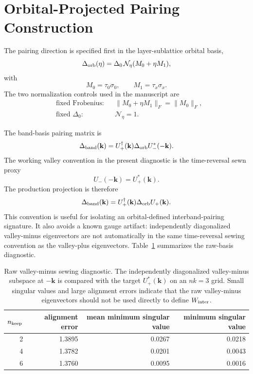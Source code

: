 \documentclass[aps,prb,preprint,superscriptaddress,floatfix,nofootinbib]{revtex4-2}
\begin{document}
\section{Orbital-Projected Pairing Construction}

The pairing direction is specified first in the layer-sublattice orbital basis,
\begin{equation}
  \Delta_{\rm orb}(\eta)
  =
  \Delta_0\,\mathcal{N}_{\eta}(M_0+\eta M_1),
\end{equation}
with
\begin{equation}
  M_0=\tau_0\sigma_0,\qquad
  M_1=\tau_x\sigma_x.
\end{equation}
The two normalization controls used in the manuscript are
\begin{align}
  &\text{fixed Frobenius:}
  &&\|M_0+\eta M_1\|_F=\|M_0\|_F,\\
  &\text{fixed }\Delta_0:
  &&\mathcal{N}_{\eta}=1.
\end{align}

The band-basis pairing matrix is
\begin{equation}
  \Delta_{\rm band}(\mathbf{k})
  =
  U_+^\dagger(\mathbf{k})\Delta_{\rm orb}U_-^*(-\mathbf{k}).
\end{equation}
The working valley convention in the present diagnostic is the time-reversal
sewn proxy
\begin{equation}
  U_{-}(-\mathbf{k}) = U_{+}^*(\mathbf{k}).
\end{equation}
The production projection is therefore
\begin{equation}
  \Delta_{\rm band}(\mathbf{k})
  =
  U_+^\dagger(\mathbf{k})\Delta_{\rm orb}U_+(\mathbf{k}).
\end{equation}
This convention is useful for isolating an orbital-defined interband-pairing
signature.  It also avoids a known gauge artifact: independently diagonalized
valley-minus eigenvectors are not automatically in the same time-reversal
sewing convention as the valley-plus eigenvectors.  Table~\ref{tab:sm_valley_sewing}
summarizes the raw-basis diagnostic.

\begin{table}[t]
\caption{Raw valley-minus sewing diagnostic.  The independently diagonalized
valley-minus subspace at $-\mathbf{k}$ is compared with the target
$U_+^*(\mathbf{k})$ on an $nk=3$ grid.  Small singular values and large
alignment errors indicate that the raw valley-minus eigenvectors should not be
used directly to define $W_{\rm inter}$.}
\label{tab:sm_valley_sewing}
\begin{ruledtabular}
\begin{tabular}{rrrr}
$n_{\rm keep}$ & alignment error & mean minimum singular value & minimum singular value\\
\hline
2 & 1.3895 & 0.0267 & 0.0218\\
4 & 1.3782 & 0.0201 & 0.0043\\
6 & 1.3760 & 0.0095 & 0.0016\\
\end{tabular}
\end{ruledtabular}
\end{table}
\end{document}
